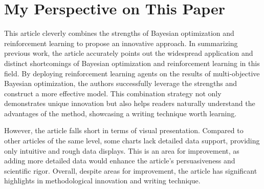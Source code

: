\section{My Perspective on This Paper}
This article cleverly combines the strengths of Bayesian optimization and reinforcement learning to propose an innovative approach. In summarizing previous work, the article accurately points out the widespread application and distinct shortcomings of Bayesian optimization and reinforcement learning in this field. By deploying reinforcement learning agents on the results of multi-objective Bayesian optimization, the authors successfully leverage the strengths and construct a more effective model. This combination strategy not only demonstrates unique innovation but also helps readers naturally understand the advantages of the method, showcasing a writing technique worth learning.

However, the article falls short in terms of visual presentation. Compared to other articles of the same level, some charts lack detailed data support, providing only intuitive and rough data displays. This is an area for improvement, as adding more detailed data would enhance the article's persuasiveness and scientific rigor. Overall, despite areas for improvement, the article has significant highlights in methodological innovation and writing technique.

%
%
%